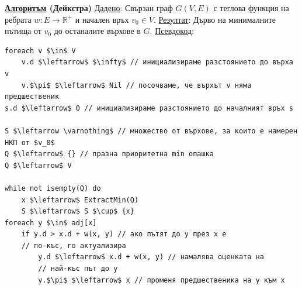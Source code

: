 \documentclass{article}
\begin{document}
\textbf{\underline{Алгоритъм} (Дейкстра)} \newline\newline
\underline{Дадено}: Свързан граф $G(V, E)$ с теглова функция на ребрата $w : E \rightarrow \mathbb{R}^+$ и начален връх $v_0 \in V$. \newline
\underline{Резултат}: Дърво на минималните пътища от $v_0$ до останалите върхове в $G$. \newline
\underline{Псевдокод}:
\begin{lstlisting}[style=CStyle]
foreach v $\in$ V
    v.d $\leftarrow$ $\infty$ // инициализираме разстоянието до върха v
    v.$\pi$ $\leftarrow$ Nil // посочваме, че върхът v няма предшественик
s.d $\leftarrow$ 0 // инициализираме разстоянието до началният връх s

S $\leftarrow \varnothing$ // множество от върхове, за които е намерен НКП от $v_0$
Q $\leftarrow$ {} // празна приоритетна min опашка
Q $\leftarrow$ V

while not isempty(Q) do
    x $\leftarrow$ ExtractMin(Q)
    S $\leftarrow$ S $\cup$ {x}
foreach y $\in$ adj[x]
    if y.d > x.d + w(x, y) // ако пътят до y през x е
    // по-къс, го актуализира
        y.d $\leftarrow$ x.d + w(x, y) // намалява оценката на
        // най-къс път до y
        y.$\pi$ $\leftarrow$ x // променя предшественика на y към x
\end{lstlisting}
\end{document}
